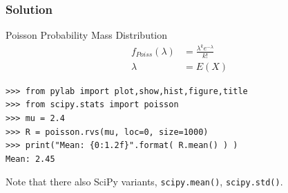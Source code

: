 \documentclass[10pt,colorlinks]{beamer}
\begin{document}
\begin{frame}[fragile]\frametitle{Solution}
\begin{block}{Poisson Probability Mass Distribution}
\begin{align}
    f_{Poiss}( \lambda ) &= \frac{\lambda^k e^{- \lambda}}{k!}\\
\lambda & = E(X)
\end{align}
\end{block}
\begin{verbatim}
>>> from pylab import plot,show,hist,figure,title
>>> from scipy.stats import poisson
>>> mu = 2.4
>>> R = poisson.rvs(mu, loc=0, size=1000)
>>> print("Mean: {0:1.2f}".format( R.mean() ) ) 
Mean: 2.45
\end{verbatim}

Note that there also SciPy variants, \verb|scipy.mean()|, \verb|scipy.std()|.
\end{frame}
\end{document}
